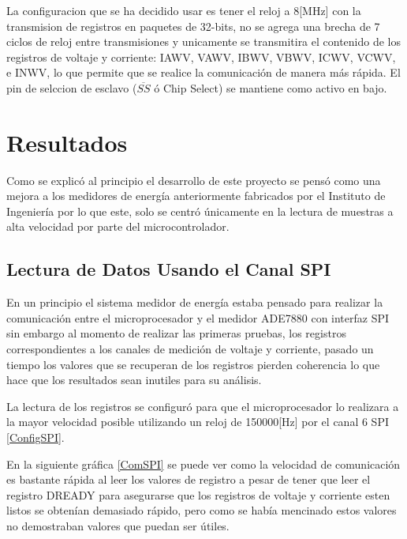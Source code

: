 \documentclass[letterpaper,12pt,oneside]{book}
\begin{document}
			La configuracion que se ha decidido usar es tener el reloj a 8[MHz] con la transmision de registros en paquetes de 32-bits, no se agrega una brecha de 7 ciclos de reloj entre transmisiones y unicamente se transmitira el contenido de los registros de voltaje y corriente: IAWV, VAWV, IBWV, VBWV, ICWV, VCWV, e INWV, lo que permite que se realice la comunicación de manera más rápida. El pin de selccion de esclavo ($\overline{SS}$ ó Chip Select) se mantiene como activo en bajo. %
	\chapter{Resultados}
	Como se explicó al principio el desarrollo de este proyecto se pensó como una mejora a los medidores de energía anteriormente fabricados por el Instituto de Ingeniería por lo que este, solo se centró únicamente en la lectura de muestras a alta velocidad por parte del microcontrolador.

		\section{Lectura de Datos Usando el Canal SPI}
		En un principio el sistema medidor de energía estaba pensado para realizar la comunicación entre el microprocesador y el medidor ADE7880 con interfaz SPI sin embargo al momento de realizar las primeras pruebas, los registros correspondientes a los canales de medición de voltaje y corriente, pasado un tiempo los valores que se recuperan de los registros pierden coherencia lo que hace que los resultados sean inutiles para su análisis.

		La lectura de los registros se configuró para que el microprocesador lo realizara a la mayor velocidad posible utilizando un reloj de 150000[Hz] por el canal 6 SPI \ref{ConfigSPI}.

		En la siguiente gráfica \ref{ComSPI} se puede ver como la velocidad de comunicación es bastante rápida al leer los valores de registro a pesar de tener que leer el registro DREADY para asegurarse que los registros de voltaje y corriente esten listos se obtenían demasiado rápido, pero como se había mencinado estos valores no demostraban valores que puedan ser útiles.
\end{document}
